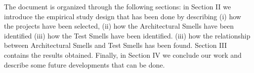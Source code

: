 The document is organized through the following sections: in Section II we introduce the empirical study design that has been done by describing (i) how the projects have been selected, (ii) how the Architectural Smells have been identified (iii) how the Test Smells have been identified. (iii) how the relationship between Architectural Smells and Test Smells has been found. Section III contains the results obtained. Finally, in Section IV we conclude our work and describe some future developments that can be done.